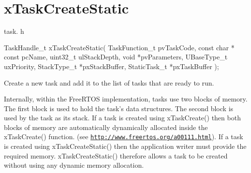 \hypertarget{group__xTaskCreateStatic}{\section{x\-Task\-Create\-Static}
\label{group__xTaskCreateStatic}
}
task. h 
\begin{DoxyPre}
 TaskHandle\_t xTaskCreateStatic( TaskFunction\_t pvTaskCode,
                                 const char * const pcName,
                                 uint32\_t ulStackDepth,
                                 void *pvParameters,
                                 UBaseType\_t uxPriority,
                                 StackType\_t *pxStackBuffer,
                                 StaticTask\_t *pxTaskBuffer );\end{DoxyPre}


Create a new task and add it to the list of tasks that are ready to run.

Internally, within the Free\-R\-T\-O\-S implementation, tasks use two blocks of memory. The first block is used to hold the task's data structures. The second block is used by the task as its stack. If a task is created using x\-Task\-Create() then both blocks of memory are automatically dynamically allocated inside the x\-Task\-Create() function. (see \href{http://www.freertos.org/a00111.html}{\tt http\-://www.\-freertos.\-org/a00111.\-html}). If a task is created using x\-Task\-Create\-Static() then the application writer must provide the required memory. x\-Task\-Create\-Static() therefore allows a task to be created without using any dynamic memory allocation.


